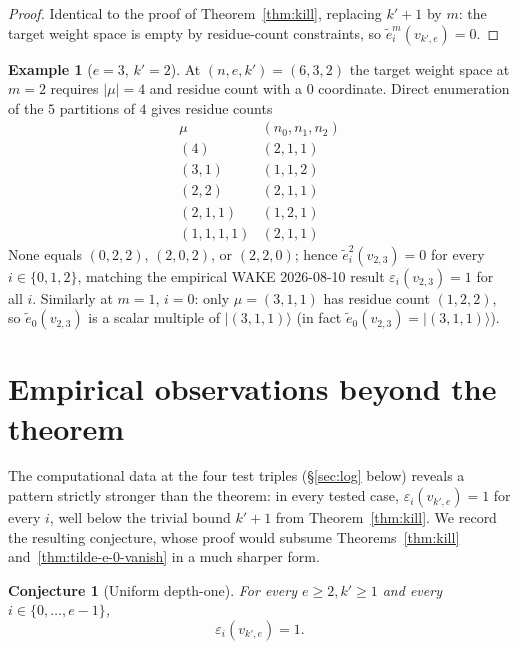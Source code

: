 \documentclass[11pt]{article}
\newtheorem{conjecture}[theorem]{Conjecture}
\theoremstyle{definition}
\newtheorem{example}[theorem]{Example}
\newcommand{\te}{\tilde e}
\newcommand{\eps}{\varepsilon}
\begin{document}
\begin{proof}
Identical to the proof of Theorem~\ref{thm:kill}, replacing $k'+1$ by $m$: the target
weight space is empty by residue-count constraints, so $\te_i^m(v_{k',e}) = 0$.
\end{proof}

\begin{example}[$e=3$, $k'=2$]\label{ex:632}
At $(n,e,k') = (6,3,2)$ the target weight space at $m = 2$ requires $|\mu| = 4$ and
residue count with a $0$ coordinate. Direct enumeration of the $5$ partitions of $4$
gives residue counts
\[
  \begin{array}{c|c}
    \mu & (n_0,n_1,n_2)\\\hline
    (4) & (2,1,1)\\
    (3,1) & (1,1,2)\\
    (2,2) & (2,1,1)\\
    (2,1,1) & (1,2,1)\\
    (1,1,1,1) & (2,1,1)
  \end{array}
\]
None equals $(0,2,2)$, $(2,0,2)$, or $(2,2,0)$; hence $\te_i^2(v_{2,3}) = 0$ for every
$i \in \{0,1,2\}$, matching the empirical WAKE 2026-08-10 result $\eps_i(v_{2,3}) = 1$
for all $i$. Similarly at $m=1$, $i=0$: only $\mu=(3,1,1)$ has residue count $(1,2,2)$,
so $\te_0(v_{2,3})$ is a scalar multiple of $|(3,1,1)\rangle$ (in fact
$\te_0(v_{2,3}) = |(3,1,1)\rangle$).
\end{example}

\section{Empirical observations beyond the theorem}\label{sec:empirical}

The computational data at the four test triples (\S\ref{sec:log} below) reveals a
pattern strictly stronger than the theorem: in every tested case,
$\eps_i(v_{k',e}) = 1$ for every $i$, well below the trivial bound $k'+1$
from Theorem~\ref{thm:kill}. We record the resulting conjecture, whose proof would
subsume Theorems~\ref{thm:kill} and~\ref{thm:tilde-e-0-vanish} in a much sharper form.

\begin{conjecture}[Uniform depth-one]\label{conj:depth-one}
For every $e\ge 2, k'\ge 1$ and every $i\in\{0,\ldots,e-1\}$,
\[
  \eps_i(v_{k',e}) = 1.
\]
\end{conjecture}
\end{document}
